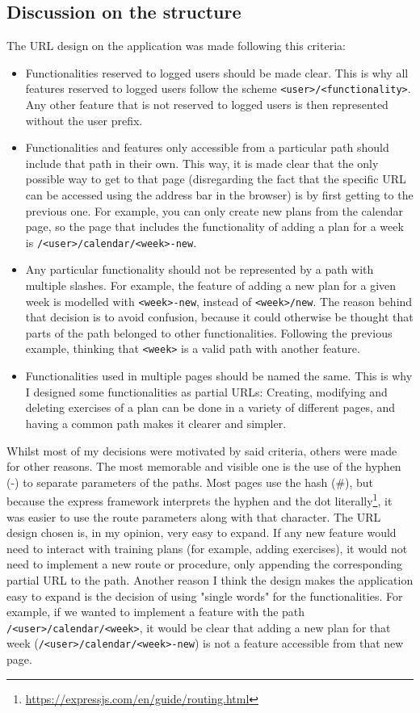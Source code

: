\documentclass[12pt,twoside,titlepage,a4paper]{article}
\theoremstyle{definicion}
\theoremstyle{lema}
\theoremstyle{teorema}
\theoremstyle{corolario}
\theoremstyle{ejemplo}
\theoremstyle{nota}
\begin{document}
\subsection{Discussion on the structure}
The URL design on the application was made following this criteria:
\begin{itemize}
	\item Functionalities reserved to logged users should be made clear. This is why all features reserved to logged users
	follow the scheme \texttt{<user>/<functionality>}. Any other feature that is not reserved to logged users is then represented
	without the user prefix.
	\item Functionalities and features only accessible from a particular path should include that path in their own. This way, it is 
	made clear that the only possible way to get to that page (disregarding the fact that the specific URL can be accessed using
	the address bar in the browser) is by first getting to the previous one. For example, you can only create new plans from the calendar
	page, so the page that includes the functionality of adding a plan for a week is \texttt{/<user>/calendar/<week>-new}.
	\item Any particular functionality should not be represented by a path with multiple slashes. For example, the feature of adding
	a new plan for a given week is modelled with \texttt{<week>-new}, instead of \texttt{<week>/new}. The reason behind that decision
	is to avoid confusion, because it could otherwise be thought that parts of the path belonged to other functionalities. Following 
	the previous example, thinking that \texttt{<week>} is a valid path with another feature.
	\item Functionalities used in multiple pages should be named the same. This is why I designed some functionalities as partial URLs:
	Creating, modifying and deleting exercises of a plan can be done in a variety of different pages, and having a common path makes
	it clearer and simpler.
\end{itemize}
Whilst most of my decisions were motivated by said criteria, others were made for other reasons. The most memorable and visible one is
the use of the hyphen (-) to separate parameters of the paths. Most pages use the hash (\#), but because the express framework interprets
the hyphen and the dot literally\footnote{\url{https://expressjs.com/en/guide/routing.html}}, it was easier to use the route parameters
along with that character.
\newline\newline
The URL design chosen is, in my opinion, very easy to expand. If any new feature would need to interact with training plans (for example,
adding exercises), it would not need to implement a new route or procedure, only appending the corresponding partial URL to the path. 
Another reason I think the design makes the application easy to expand is the decision of using "single words" for the functionalities. 
For example, if we wanted to implement a feature with the path \texttt{/<user>/calendar/<week>}, it would be clear that adding a new plan 
for that week (\texttt{/<user>/calendar/<week>-new}) is not a feature accessible from that new page.
\end{document}
